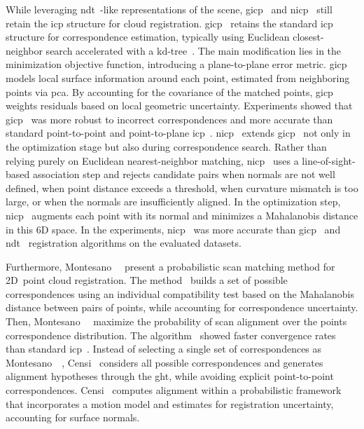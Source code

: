 While leveraging
\gls{ndt}~\cite{biber-strasser:iros:2003,magnusson:jfr:2007}-like
representations of the scene, \gls{gicp}~\cite{segal:rss:2009} and
\gls{nicp}~\cite{serafin-grisetti:iros:2015} still retain the \gls{icp}
structure for cloud registration.
\gls{gicp}~\cite{segal:rss:2009} retains the standard \gls{icp}
structure for correspondence estimation, typically using Euclidean
closest-neighbor search accelerated with a kd-tree~\cite{bentley:cacm:1975}.
The main modification lies in the minimization objective function,
introducing a plane-to-plane error metric. \gls{gicp} models
local surface information around each point, estimated from
neighboring points via \gls{pca}. By accounting for the covariance of
the matched points, \gls{gicp} weights residuals based on
local geometric uncertainty. Experiments showed that
\gls{gicp}~\cite{segal:rss:2009} was more robust to incorrect correspondences
and more accurate than standard point-to-point and point-to-plane
\gls{icp}~\cite{besl-mckay:tpami:1992,chen-medioni:icra:1991}.
\gls{nicp}~\cite{serafin-grisetti:iros:2015} extends
\gls{gicp}~\cite{segal:rss:2009} not only in the optimization stage but also
during correspondence search.
Rather than relying purely on Euclidean nearest-neighbor matching,
\gls{nicp}~\cite{serafin-grisetti:iros:2015} uses a line-of-sight-based
association step and rejects candidate pairs when normals are not well defined,
when point distance exceeds a threshold, when curvature mismatch is too large,
or when the normals are insufficiently aligned. In the optimization step,
\gls{nicp}~\cite{serafin-grisetti:iros:2015} augments each point with
its normal and minimizes a Mahalanobis distance in this 6D space.
In the experiments, \gls{nicp}~\cite{serafin-grisetti:iros:2015} was more
accurate than \gls{gicp}~\cite{segal:rss:2009} and
\gls{ndt}~\cite{magnusson:jfr:2007}
registration algorithms on the evaluated datasets.

Furthermore, Montesano~\etal~\cite{montesano:iros:2005} present
a probabilistic scan matching method for 2D~point cloud registration.
The method~\cite{montesano:iros:2005} builds a set of possible correspondences
using an individual compatibility test based on the Mahalanobis distance
between pairs of points, while accounting for correspondence uncertainty.
Then, Montesano~\etal~\cite{montesano:iros:2005} maximize
the probability of scan alignment over the points correspondence distribution.
The algorithm~\cite{montesano:iros:2005} showed faster convergence
rates than standard \gls{icp}~\cite{besl-mckay:tpami:1992}.
Instead of selecting a single set of correspondences as
Montesano~\etal~\cite{montesano:iros:2005}, Censi~\cite{censi:icra:2006}
considers all possible correspondences and generates alignment hypotheses
through the \gls{ght}, while avoiding explicit point-to-point correspondences.
Censi~\cite{censi:icra:2006} computes alignment within
a probabilistic framework that incorporates a motion model and estimates
for registration uncertainty, accounting for surface normals.


